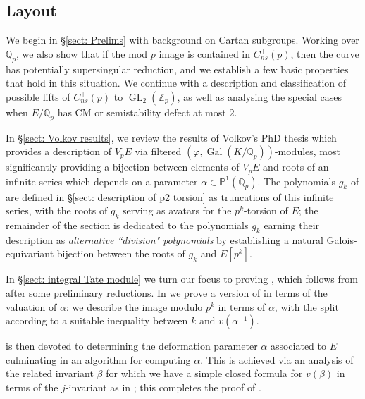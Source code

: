 \documentclass{amsart}
\newcommand{\op}[1]{\operatorname{#1}}
\newcommand{\Qp}{\mathbb{Q}_p}
\theoremstyle{definition}
\newcommand{\Z}{\mathbb{Z}}
\newcommand{\Q}{\mathbb{Q}}
\numberwithin{theorem}{section}
\numberwithin{equation}{section}
\begin{document}
\subsection{Layout}
We begin in \S\ref{sect: Prelims} with background on Cartan subgroups. Working over $\Q_p$, we also show that if the mod $p$ image is contained in $C_{ns}^+(p)$, then the curve has potentially supersingular reduction, and we establish a few basic properties that hold in this situation. We continue with a description and classification of possible lifts of $C_{ns}^+(p)$ to $\op{GL}_2(\Z_p)$, as well as analysing the special cases when $E/\Qp$ has CM or semistability defect at most $2$.

In \S\ref{sect: Volkov results}, we review the results of Volkov's PhD thesis which provides a description of $V_pE$ via filtered $(\varphi,\op{Gal}(K/\Qp))$-modules, most significantly providing a bijection between elements of $V_pE$ and roots of an infinite series which depends on a parameter $\alpha \in \mathbb{P}^1(\Qp)$. The polynomials $g_k$ of  are defined in \S\ref{sect: description of p2 torsion} as truncations of this infinite series, with the roots of $g_k$ serving as avatars for the $p^k$-torsion of $E$; the remainder of the section is dedicated to the polynomials $g_k$ earning their description as \textit{alternative ``division" polynomials} by establishing a natural Galois-equivariant bijection between the roots of $g_k$ and $E[p^k]$.

In \S\ref{sect: integral Tate module} we turn our focus to proving , which follows from  after some preliminary reductions. In  we prove a version of  in terms of the valuation of $\alpha$: we describe the image modulo $p^k$ in terms of $\alpha$, with the split according to a suitable inequality between $k$ and $v(\alpha^{-1})$.

 is then devoted to determining the deformation parameter $\alpha$ associated to $E$ culminating in an algorithm for computing $\alpha$. This is achieved via an analysis of the related invariant $\beta$ for which we have a simple closed formula for $v(\beta)$ in terms of the $j$-invariant as in ; this completes the proof of .
\end{document}
